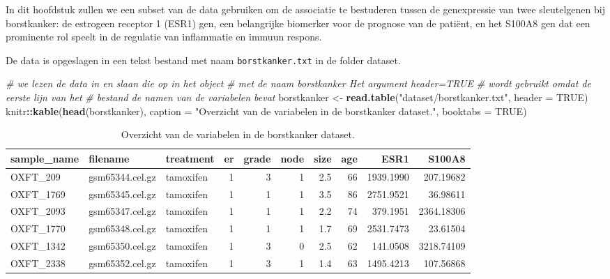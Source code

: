 \documentclass[12pt,dutch,coursenotes]{book}
\newenvironment{Shaded}{\begin{snugshade}}{\end{snugshade}}
\newcommand{\KeywordTok}[1]{\textcolor[rgb]{0.13,0.29,0.53}{\textbf{#1}}}
\newcommand{\DataTypeTok}[1]{\textcolor[rgb]{0.13,0.29,0.53}{#1}}
\newcommand{\StringTok}[1]{\textcolor[rgb]{0.31,0.60,0.02}{#1}}
\newcommand{\CommentTok}[1]{\textcolor[rgb]{0.56,0.35,0.01}{\textit{#1}}}
\newcommand{\OtherTok}[1]{\textcolor[rgb]{0.56,0.35,0.01}{#1}}
\newcommand{\OperatorTok}[1]{\textcolor[rgb]{0.81,0.36,0.00}{\textbf{#1}}}
\newcommand{\NormalTok}[1]{#1}
\theoremstyle{definition}
\theoremstyle{definition}
\theoremstyle{definition}
\theoremstyle{remark}
\begin{document}
In dit hoofdstuk zullen we een subset van de data gebruiken om de
associatie te bestuderen tussen de genexpressie van twee sleutelgenen
bij borstkanker: de estrogeen receptor 1 (ESR1) gen, een belangrijke
biomerker voor de prognose van de patiënt, en het S100A8 gen dat een
prominente rol speelt in de regulatie van inflammatie en immuun respons.

De data is opgeslagen in een tekst bestand met naam
\texttt{borstkanker.txt} in de folder dataset.

\begin{Shaded}
\begin{Highlighting}[]
\CommentTok{# we lezen de data in en slaan die op in het object}
\CommentTok{# met de naam borstkanker Het argument header=TRUE}
\CommentTok{# wordt gebruikt omdat de eerste lijn van het}
\CommentTok{# bestand de namen van de variabelen bevat}
\NormalTok{borstkanker <-}\StringTok{ }\KeywordTok{read.table}\NormalTok{(}\StringTok{"dataset/borstkanker.txt"}\NormalTok{, }
    \DataTypeTok{header =} \OtherTok{TRUE}\NormalTok{)}
\NormalTok{knitr}\OperatorTok{::}\KeywordTok{kable}\NormalTok{(}\KeywordTok{head}\NormalTok{(borstkanker), }\DataTypeTok{caption =} \StringTok{"Overzicht van de variabelen in de borstkanker dataset."}\NormalTok{, }
    \DataTypeTok{booktabs =} \OtherTok{TRUE}\NormalTok{)}
\end{Highlighting}
\end{Shaded}

\begin{table}

\caption{\label{tab:brcaMicroLin}Overzicht van de variabelen in de borstkanker dataset.}
\centering
\begin{tabular}[t]{lllrrrrrrr}
\toprule
sample\_name & filename & treatment & er & grade & node & size & age & ESR1 & S100A8\\
\midrule
OXFT\_209 & gsm65344.cel.gz & tamoxifen & 1 & 3 & 1 & 2.5 & 66 & 1939.1990 & 207.19682\\
OXFT\_1769 & gsm65345.cel.gz & tamoxifen & 1 & 1 & 1 & 3.5 & 86 & 2751.9521 & 36.98611\\
OXFT\_2093 & gsm65347.cel.gz & tamoxifen & 1 & 1 & 1 & 2.2 & 74 & 379.1951 & 2364.18306\\
OXFT\_1770 & gsm65348.cel.gz & tamoxifen & 1 & 1 & 1 & 1.7 & 69 & 2531.7473 & 23.61504\\
OXFT\_1342 & gsm65350.cel.gz & tamoxifen & 1 & 3 & 0 & 2.5 & 62 & 141.0508 & 3218.74109\\
OXFT\_2338 & gsm65352.cel.gz & tamoxifen & 1 & 3 & 1 & 1.4 & 63 & 1495.4213 & 107.56868\\
\bottomrule
\end{tabular}
\end{table}
\end{document}
